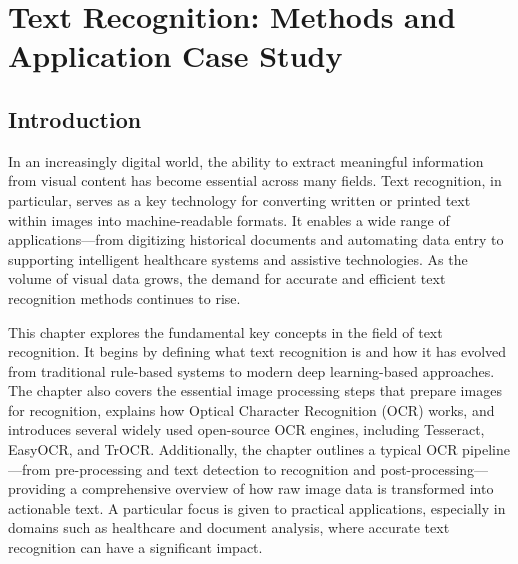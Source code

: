 \chapter{Text Recognition: Methods and Application Case Study}
\clearpage
    
  
\section{Introduction}
\vspace{-0.5cm}



In an increasingly digital world, the ability to extract meaningful information from visual content has become essential across many fields. Text recognition, in particular, serves as a key technology for converting written or printed text within images into machine-readable formats. It enables a wide range of applications—from digitizing historical documents and automating data entry to supporting intelligent healthcare systems and assistive technologies. As the volume of visual data grows, the demand for accurate and efficient text recognition methods continues to rise.


This chapter explores the fundamental key concepts in the field of text recognition. It begins by defining what text recognition is and how it has evolved from traditional rule-based systems to modern deep learning-based approaches. The chapter also covers the essential image processing steps that prepare images for recognition, explains how Optical Character Recognition (OCR) works, and introduces several widely used open-source OCR engines, including Tesseract, EasyOCR, and TrOCR.
Additionally, the chapter outlines a typical OCR pipeline—from pre-processing and text detection to recognition and post-processing—providing a comprehensive overview of how raw image data is transformed into actionable text. A particular focus is given to practical applications, especially in domains such as healthcare and document analysis, where accurate text recognition can have a significant impact.%
\vspace{-0.5cm}
